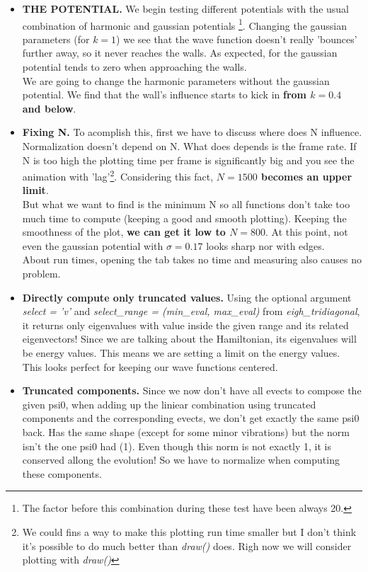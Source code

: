 \documentclass{article}
\begin{document}
\begin{itemize}
	\item \textbf{THE POTENTIAL.} We begin testing different potentials with the usual combination of harmonic and gaussian potentials \footnote{The factor before this combination during these test have been always 20.}. Changing the gaussian parameters (for $k = 1$) we see that the wave function doesn't really 'bounces' further away, so it never reaches the walls. As expected, for the gaussian potential tends to zero when approaching the walls.\\
	We are going to change the harmonic parameters without the gaussian potential. We find that the wall's influence starts to kick in \textbf{from $k = 0.4$ and below}.
	
	\item \textbf{Fixing N.} To acomplish this, first we have to discuss where does N influence. Normalization doesn't depend on N. What does depends is the frame rate. If N is too high the plotting time per frame is significantly big and you see the animation with 'lag'\footnote{We could fins a way to make this plotting run time smaller but I don't think it's possible to do much better than \textit{draw()} does. Righ now we will consider plotting with \textit{draw()}}. Considering this fact, \textbf{$N = 1500$ becomes an upper limit}. \\
	But what we want to find is the minimum N so all functions don't take too much time to compute (keeping a good and smooth plotting). Keeping the smoothness of the plot, \textbf{we can get it low to $N = 800$}. At this point, not even the gaussian potential with $\sigma = 0.17$ looks sharp nor with edges.\\
	About run times, opening the tab takes no time and measuring also causes no problem.
	
	\item \textbf{Directly compute only truncated values.} Using the optional argument \textit{select = 'v'} and \textit{select\_range = (min\_eval, max\_eval)} from \textit{eigh\_tridiagonal}, it returns only eigenvalues with value inside the given range and its related eigenvectors! Since we are talking about the Hamiltonian, its eigenvalues will be energy values. This means we are setting a limit on the energy values. This looks perfect for keeping our wave functions centered. 
	
	\item \textbf{Truncated components.} Since we now don't have all evects to compose the given psi0, when adding up the liniear combination using truncated components and the corresponding evects, we don't get exactly the same psi0 back. Has the same shape (except for some minor vibrations) but the norm isn't the one psi0 had (1). Even though this norm is not exactly 1, it is conserved allong the evolution! So we have to normalize when computing these components. 
	

\end{itemize}
\end{document}

